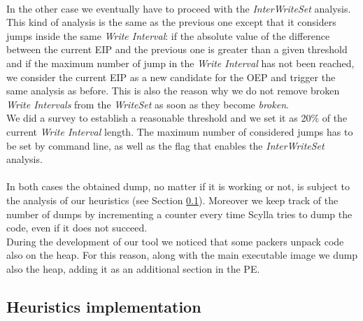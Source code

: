 \paragraph{}
In the other case we eventually have to proceed with the \textit{InterWriteSet} analysis. This kind of analysis is the same as the previous one except that it considers jumps inside the same \textit{Write Interval}: if the absolute value of the difference between the current \ac{EIP} and the previous one is greater than a given threshold and if the maximum number of jump in the \textit{Write Interval} has not been reached, we consider the current \ac{EIP} as a new candidate for the \ac{OEP} and trigger the same analysis as before. This is also the reason why we do not remove broken \textit{Write Intervals} from the \textit{WriteSet} as soon as they become \textit{broken}.\\
We did a survey to establish a reasonable threshold and we set it as 20\% of the current  \textit{Write Interval} length. The maximum number of considered jumps has to be set by command line, as well as the flag that enables the \textit{InterWriteSet} analysis.
\paragraph{}
In both cases the obtained dump, no matter if it is working or not, is subject to the analysis of our heuristics (see Section \ref{Heuristics implementation}). Moreover we keep track of the number of dumps by incrementing a counter every time Scylla tries to dump the code, even if it does not succeed.\\
During the development of our tool we noticed that some packers unpack code also on the heap. For this reason, along with the main executable image we dump also the heap, adding it as an additional section in the \ac{PE}.

\subsection{Heuristics implementation}
\label{Heuristics implementation}
